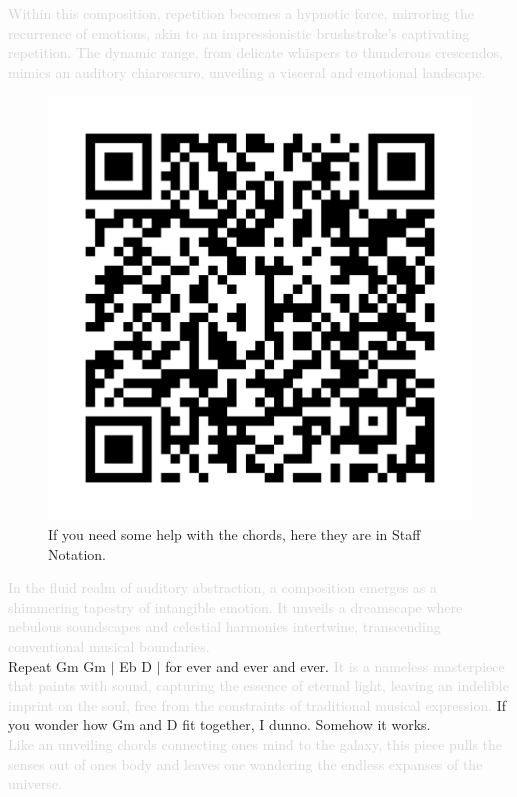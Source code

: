 \textcolor{lightgray}{Within this composition, repetition becomes a hypnotic force, mirroring the recurrence of emotions, akin to an impressionistic brushstroke's captivating repetition. The dynamic range, from delicate whispers to thunderous crescendos, mimics an auditory chiaroscuro, unveiling a visceral and emotional landscape.}
\begin{figure}
\includegraphics[width=1\linewidth]{QR_Codes/QR_LuxAeterna_Chords.png}\\
If you need some help with the chords, here they are in Staff Notation.
\end{figure}
\textcolor{lightgray}{In the fluid realm of auditory abstraction, a composition emerges as a shimmering tapestry of intangible emotion. It unveils a dreamscape where nebulous soundscapes and celestial harmonies intertwine, transcending conventional musical boundaries.}\\
Repeat  Gm Gm $|$ Eb  D $|$ for ever and ever and ever.
\textcolor{lightgray}{It is a nameless masterpiece that paints with sound, capturing the essence of eternal light, leaving an indelible imprint on the soul, free from the constraints of traditional musical expression.} If you wonder how Gm and D fit together, I dunno. Somehow it works.\\
\textcolor{lightgray}{Like an unveiling chords connecting ones mind to the galaxy, this piece pulls the senses out of ones body and leaves one wandering the endless expanses of the universe.}
